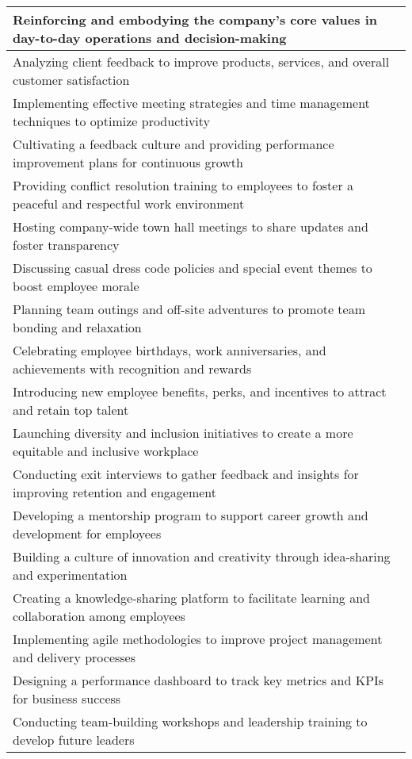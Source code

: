 \begin{xltabular}{\linewidth}{X}
 \midrule
Reinforcing and embodying the company's core values in day-to-day operations and decision-making \\ 
 \midrule
Analyzing client feedback to improve products, services, and overall customer satisfaction \\ 
 \midrule
Implementing effective meeting strategies and time management techniques to optimize productivity \\ 
 \midrule
Cultivating a feedback culture and providing performance improvement plans for continuous growth \\ 
 \midrule
Providing conflict resolution training to employees to foster a peaceful and respectful work environment \\ 
 \midrule
Hosting company-wide town hall meetings to share updates and foster transparency \\ 
 \midrule
Discussing casual dress code policies and special event themes to boost employee morale \\ 
 \midrule
Planning team outings and off-site adventures to promote team bonding and relaxation \\ 
 \midrule
Celebrating employee birthdays, work anniversaries, and achievements with recognition and rewards \\ 
 \midrule
Introducing new employee benefits, perks, and incentives to attract and retain top talent \\ 
 \midrule
Launching diversity and inclusion initiatives to create a more equitable and inclusive workplace \\ 
 \midrule
Conducting exit interviews to gather feedback and insights for improving retention and engagement \\ 
 \midrule
Developing a mentorship program to support career growth and development for employees \\ 
 \midrule
Building a culture of innovation and creativity through idea-sharing and experimentation \\ 
 \midrule
Creating a knowledge-sharing platform to facilitate learning and collaboration among employees \\ 
 \midrule
Implementing agile methodologies to improve project management and delivery processes \\ 
 \midrule
Designing a performance dashboard to track key metrics and KPIs for business success \\ 
 \midrule
Conducting team-building workshops and leadership training to develop future leaders \\ 

\end{xltabular}
